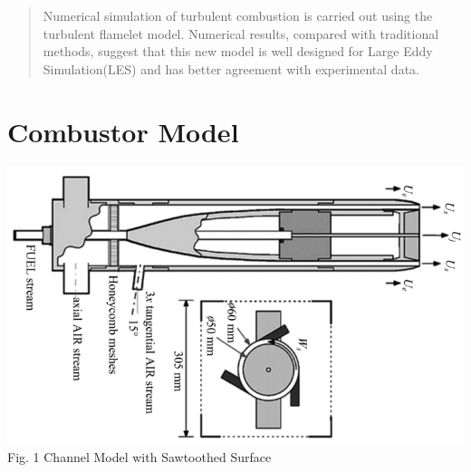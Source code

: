 \documentclass[a0,portrait]{a0poster}
\begin{document}
\begin{multicols}{2} %

\color{Navy} %

\begin{abstract}

\large Numerical simulation of turbulent combustion is carried out using the turbulent flamelet model. Numerical results, compared with traditional methods, suggest that this new model is well designed for Large Eddy Simulation(LES) and has better agreement with experimental data.

\end{abstract}

\color{SaddleBrown} %
\section*{Combustor Model}
	\begin{center}
		\vspace{-0.5cm}
		\includegraphics[width=0.8\linewidth]{pic/burner.png}\\
		\vspace{-0.5cm}
		{\color{Green} Fig. 1 Channel Model with Sawtoothed Surface}
	\end{center}


\end{multicols}
\end{document}
